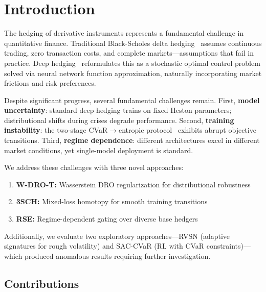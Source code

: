 \documentclass[11pt]{article}
\begin{document}
\section{Introduction}
\label{sec:introduction}

The hedging of derivative instruments represents a fundamental challenge in quantitative finance. Traditional Black-Scholes delta hedging~\citep{black1973pricing} assumes continuous trading, zero transaction costs, and complete markets---assumptions that fail in practice. Deep hedging~\citep{buehler2019deep} reformulates this as a stochastic optimal control problem solved via neural network function approximation, naturally incorporating market frictions and risk preferences.

Despite significant progress, several fundamental challenges remain. First, \textbf{model uncertainty}: standard deep hedging trains on fixed Heston parameters; distributional shifts during crises degrade performance. Second, \textbf{training instability}: the two-stage CVaR$\to$entropic protocol~\citep{kozyra2019deep} exhibits abrupt objective transitions. Third, \textbf{regime dependence}: different architectures excel in different market conditions, yet single-model deployment is standard.

We address these challenges with three novel approaches:

\begin{enumerate}[noitemsep,leftmargin=*]
    \item \textbf{W-DRO-T:} Wasserstein DRO regularization for distributional robustness
    \item \textbf{3SCH:} Mixed-loss homotopy for smooth training transitions
    \item \textbf{RSE:} Regime-dependent gating over diverse base hedgers
\end{enumerate}

Additionally, we evaluate two exploratory approaches---RVSN (adaptive signatures for rough volatility) and SAC-CVaR (RL with CVaR constraints)---which produced anomalous results requiring further investigation.

\subsection{Contributions}
\end{document}
